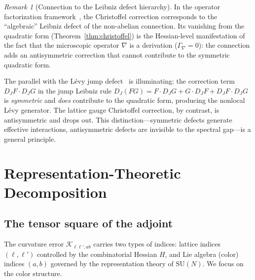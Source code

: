 \documentclass[11pt,a4paper]{article}
\theoremstyle{plain}
\theoremstyle{definition}
\theoremstyle{remark}
\newtheorem{remark}[theorem]{Remark}
\newcommand{\SU}{\mathrm{SU}}
\newcommand{\cK}{\mathcal{K}}
\begin{document}
\begin{remark}[Connection to the Leibniz defect hierarchy]
In the operator factorization
framework~\cite{Fontes2026a,Fontes2026d}, the Christoffel
correction corresponds to the ``algebraic'' Leibniz defect of
the non-abelian connection. Its vanishing from the quadratic
form (Theorem~\ref{thm:christoffel}) is the Hessian-level
manifestation of the fact that the microscopic operator $\nabla$
is a derivation ($\Gamma_\nabla = 0$): the connection adds an
antisymmetric correction that cannot contribute to the symmetric
quadratic form.

The parallel with the L\'evy jump
defect~\cite{Fontes2026i,Fontes2026d} is illuminating: the
correction term $D_J F \cdot D_J G$ in the jump Leibniz rule
$D_J(FG) = F \cdot D_J G + G \cdot D_J F + D_J F \cdot D_J G$
is \emph{symmetric} and \emph{does} contribute to the
quadratic form, producing the nonlocal L\'evy generator.
The lattice gauge Christoffel correction, by contrast, is
antisymmetric and drops out. This distinction---symmetric
defects generate effective interactions, antisymmetric defects
are invisible to the spectral gap---is a general principle.
\end{remark}


\section{Representation-Theoretic Decomposition}\label{sec:decomp}

\subsection{The tensor square of the adjoint}

The curvature error $\cK_{\ell\ell',ab}$ carries two types of
indices: lattice indices $(\ell,\ell')$ controlled by the
combinatorial Hessian $H$, and Lie algebra (color) indices
$(a,b)$ governed by the representation theory of $\SU(N)$.
We focus on the color structure.
\end{document}

